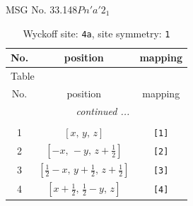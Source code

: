 \documentclass[fleqn,8pt]{jsarticle}
\begin{document}
\setcounter{MaxMatrixCols}{32}

\renewcommand{\tablename}{Table~}
\renewcommand{\figurename}{Figure~}
\begin{center}
\LARGE
MSG No. 33.148\quad$Pn'a'2_{1}$
\end{center}
\renewcommand{\arraystretch}{1.2}
\begin{longtable}{ccc}
\caption{Wyckoff site: {\tt 4a}, site symmetry: {\tt 1}}
 \\
 \hline \hline
No. & position & mapping \\ \hline \endfirsthead

\multicolumn{2}{l}{\tablename\ \thetable{}} \\
 \hline \hline
No. & position & mapping \\ \hline \endhead

 \hline \hline
\multicolumn{2}{r}{\footnotesize\it continued ...} \\ \endfoot

 \hline \hline
\multicolumn{2}{r}{} \\ \endlastfoot

1 & $\left[ x,\, y,\, z \right]$ & {\tt [1]} \\ \hline
2 & $\left[ - x,\, - y,\, z + \frac{1}{2} \right]$ & {\tt [2]} \\ \hline
3 & $\left[ \frac{1}{2} - x,\, y + \frac{1}{2},\, z + \frac{1}{2} \right]$ & {\tt [3]} \\ \hline
4 & $\left[ x + \frac{1}{2},\, \frac{1}{2} - y,\, z \right]$ & {\tt [4]} \\
\end{longtable}
\end{document}
